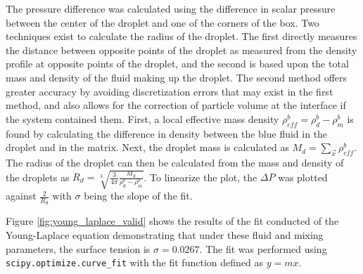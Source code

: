 The pressure difference was calculated using the difference in scalar pressure between the center of the droplet and 
one of the corners of the box. Two techniques exist to calculate the radius of the droplet. The first directly measures 
the distance between opposite points of the droplet as measured from the density profile at opposite points of the droplet, 
and the second is based upon the total mass and density of the fluid making up the droplet. The second method offers greater 
accuracy by avoiding discretization errors that may exist in the first method, and also allows for the correction of 
particle volume at the interface if the system contained them. First, a local effective mass density 
$\rho^b_{eff} = \rho^{b}_{d} - \rho^{b}_{m}$ is found by calculating the difference in density between the blue 
fluid in the droplet and in the matrix. Next, the droplet mass is calculated as $M_d = \sum_{\vec{x}}{\rho_{eff}^{b}}$. 
The radius of the droplet can then be calculated from the mass and density of the droplets as $R_d = \sqrt[3]{\frac{3}{4\pi} 
\frac{M_d}{\rho^b_d - \rho^b_m}}$. To linearize the plot, the $\Delta P$ was plotted against $\frac{2}{R_d}$ with 
$\sigma$ being the slope of the fit.

Figure \ref{fig:young_laplace_valid} shows the results of the fit conducted of the Young-Laplace equation demonstrating 
that under these fluid and mixing parameters, the surface tension is $\sigma = 0.0267$. The fit was performed using 
\texttt{scipy.optimize.curve\_fit} with the fit function defined as $y = mx$.